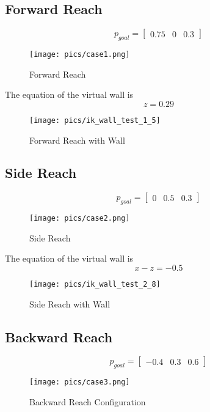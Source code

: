 \documentclass[english,10pt,a4paper]{book}
\begin{document}
		\subsection{Forward Reach}
		\begin{equation}
			p_{goal} = \begin{bmatrix}
				0.75 &  0 & 0.3
			\end{bmatrix}
		\end{equation}
		\begin{figure}[H]
			\centering
			\texttt{[image: pics/case1.png]}
			\caption{Forward Reach}
		\end{figure}
		
		The equation of the virtual wall is 
		\begin{equation*}
			z = 0.29
		\end{equation*}
		
		\begin{figure}[H]
			\centering
			\texttt{[image: pics/ik\_wall\_test\_1\_5]}
			\caption{Forward Reach with Wall}
		\end{figure}
		
		\subsection{Side Reach}
		\begin{equation}
			p_{goal} = \begin{bmatrix}
				0 & 0.5 & 0.3
			\end{bmatrix}
		\end{equation}
		\begin{figure}[H]
			\centering
			\texttt{[image: pics/case2.png]}
			\caption{Side Reach}
		\end{figure}
		
		The equation of the virtual wall is 
		\begin{equation*}
			x-z = -0.5
		\end{equation*}
		
		\begin{figure}[H]
			\centering
			\texttt{[image: pics/ik\_wall\_test\_2\_8]}
			\caption{Side Reach with Wall}
		\end{figure}
		
		\subsection{Backward Reach}
		\begin{equation}
			p_{goal} = \begin{bmatrix}
				-0.4 & 0.3 & 0.6
			\end{bmatrix}
		\end{equation}
		\begin{figure}[H]
			\centering
			\texttt{[image: pics/case3.png]}
			\caption{Backward Reach Configuration}
		\end{figure}
		
\end{document}
